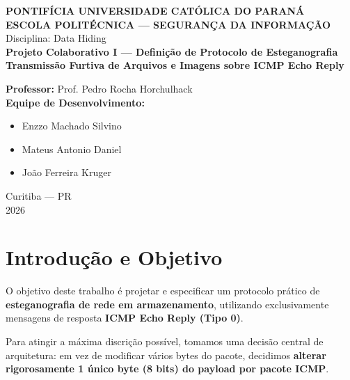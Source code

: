 \documentclass[12pt,a4paper]{article}
\begin{document}
\begin{titlepage}
    \centering
    \vspace*{1.0cm}
    
    {\Large \textbf{PONTIFÍCIA UNIVERSIDADE CATÓLICA DO PARANÁ}}\\[0.3cm]
    {\large \textbf{ESCOLA POLITÉCNICA --- SEGURANÇA DA INFORMAÇÃO}}\\[0.2cm]
    {\large Disciplina: Data Hiding}\\[3.0cm]

    {\LARGE \bfseries \color{primary} Projeto Colaborativo I --- Definição de Protocolo de Esteganografia}\\[0.6cm]
    {\large \textbf{Transmissão Furtiva de Arquivos e Imagens sobre ICMP Echo Reply}}\\[3.0cm]

    \begin{flushleft}
        \textbf{Professor:} Prof. Pedro Rocha Horchulhack\\[0.8cm]
        \textbf{Equipe de Desenvolvimento:}\\[0.2cm]
        \begin{itemize}[leftmargin=1.2cm, label=--]
            \item Enzzo Machado Silvino
            \item Mateus Antonio Daniel
            \item João Ferreira Kruger
        \end{itemize}
    \end{flushleft}

    \vfill
    {\large Curitiba --- PR}\\[0.2cm]
    {\large 2026}
\end{titlepage}

\newpage
\tableofcontents
\newpage

\section{Introdução e Objetivo}

O objetivo deste trabalho é projetar e especificar um protocolo prático de \textbf{esteganografia de rede em armazenamento}, utilizando exclusivamente mensagens de resposta \textbf{ICMP Echo Reply (Tipo 0)}.

Para atingir a máxima discrição possível, tomamos uma decisão central de arquitetura: em vez de modificar vários bytes do pacote, decidimos \textbf{alterar rigorosamente 1 único byte (8 bits) do payload por pacote ICMP}.
\end{document}
